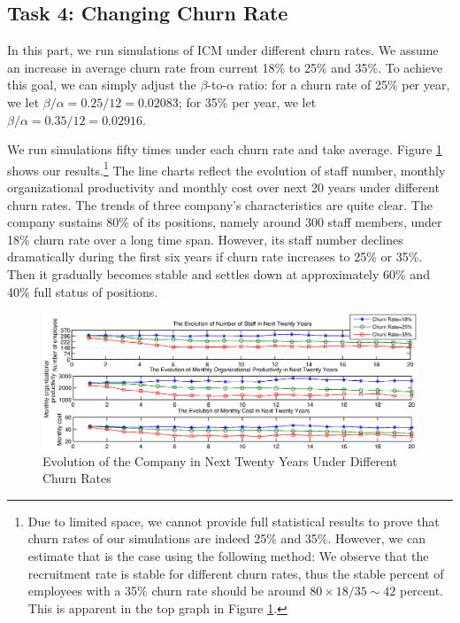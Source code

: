 \documentclass[tcn = 37075, sheet = false, abstract = false]{mcmthesis}
\begin{document}
	\subsection{Task 4: Changing Churn Rate}
	
	In this part, we run simulations of ICM under different churn rates. We assume an increase in average churn rate from current 18\% to 25\% and 35\%. To achieve this goal, we can simply adjust the $\beta$-to-$\alpha$ ratio: for a churn rate of 25\% per year, we let $\beta/\alpha = 0.25/12 = 0.02083$; for 35\% per year, we let $\beta/\alpha = 0.35/12 = 0.02916$.
	
	We run simulations fifty times under each churn rate and take average.  Figure \ref{fig:churn} shows our results.\footnote{Due to limited space, we cannot provide full statistical results to prove that churn rates of our simulations are indeed 25\% and 35\%. However, we can estimate that is the case using the following method: We observe that the recruitment rate is stable for different churn rates, thus the stable percent of employees with a 35\% churn rate should be around $80 \times 18 / 35 \sim 42$ percent. This is apparent in the top graph in Figure \ref{fig:churn}.} The line charts reflect the evolution of staff number, monthly organizational productivity and monthly cost over next 20 years under different churn rates. The trends of three company's characteristics are quite clear. The company sustains 80\% of its positions, namely around 300 staff members, under 18\% churn rate over a long time span. However, its staff number declines dramatically during the first six years if churn rate increases to 25\% or 35\%. Then it gradually becomes stable and settles down at approximately 60\% and 40\% full status of positions.
	
	
	\begin{figure}[htb!]
		\centering
		\includegraphics[width=16cm]{figures/Task4_1.eps}
		\caption{Evolution of the Company in Next Twenty Years Under Different Churn Rates} 
		\label{fig:churn}
	\end{figure}
	
\end{document}
